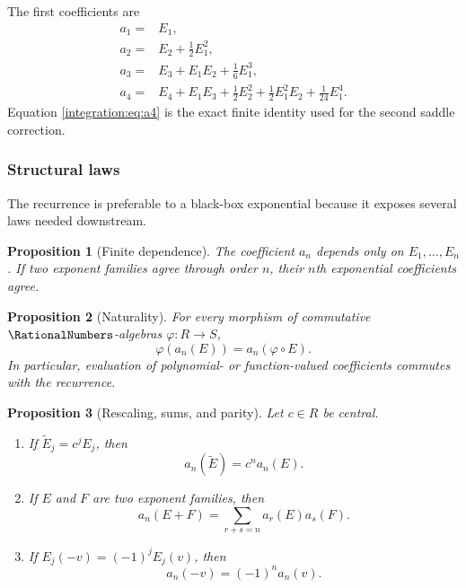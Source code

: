 \documentclass[11pt,oneside]{article}
\newtheorem{proposition}[proposition]{Proposition}
\theoremstyle{definition}
\theoremstyle{remark}
\begin{document}
The first coefficients are
\begin{align}
 a_1={}&E_1,                                                  \label{integration:eq:a1}\\
 a_2={}&E_2+\frac12E_1^2,                                    \label{integration:eq:a2}\\
 a_3={}&E_3+E_1E_2+\frac16E_1^3,                             \label{integration:eq:a3}\\
 a_4={}&E_4+E_1E_3+\frac12E_2^2
       +\frac12E_1^2E_2+\frac1{24}E_1^4.                    \label{integration:eq:a4}
\end{align}
Equation \eqref{integration:eq:a4} is the exact finite identity used for the second saddle correction.

\subsubsection{Structural laws}

The recurrence is preferable to a black-box exponential because it exposes several laws
needed downstream.

\begin{proposition}[Finite dependence]
\label{integration:prop:expcoeff-finite-dependence}
The coefficient $a_n$ depends only on $E_1,\ldots,E_n$.  If two exponent families agree
through order $n$, their $n$th exponential coefficients agree.
\end{proposition}

\begin{proposition}[Naturality]
\label{integration:prop:expcoeff-naturality}
For every morphism of commutative $\RationalNumbers$-algebras $\varphi:R\to S$,
\begin{equation}
 \varphi(a_n(E))=a_n(\varphi\circ E).
 \label{integration:eq:expcoeff-map}
\end{equation}
In particular, evaluation of polynomial- or function-valued coefficients commutes with the
recurrence.
\end{proposition}

\begin{proposition}[Rescaling, sums, and parity]
\label{integration:prop:expcoeff-structure}
Let $c\in R$ be central.
\begin{enumerate}
 \item If $\widetilde E_j=c^jE_j$, then
 \begin{equation}
  a_n(\widetilde E)=c^na_n(E).
  \label{integration:eq:expcoeff-rescale}
 \end{equation}
 \item If $E$ and $F$ are two exponent families, then
 \begin{equation}
  a_n(E+F)=\sum_{r+s=n}a_r(E)a_s(F).
  \label{integration:eq:expcoeff-add-convolution}
 \end{equation}
 \item If $E_j(-v)=(-1)^jE_j(v)$, then
 \begin{equation}
  a_n(-v)=(-1)^na_n(v).
  \label{integration:eq:expcoeff-parity}
 \end{equation}
\end{enumerate}
\end{proposition}
\end{document}
